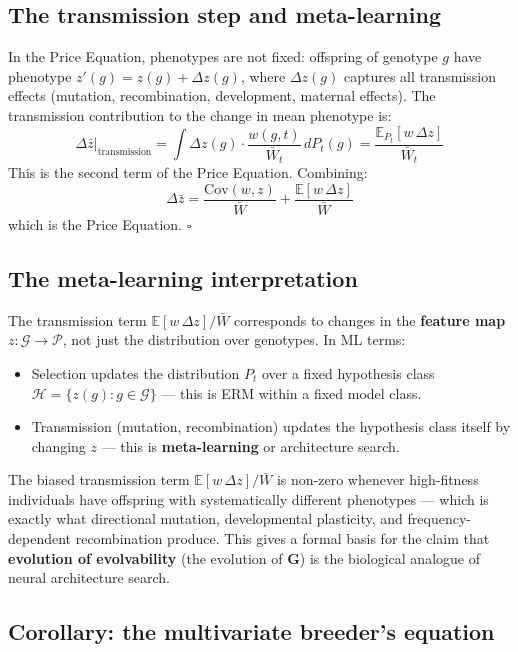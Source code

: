 \documentclass[12pt]{article}
\theoremstyle{remark}
\begin{document}
\subsection{The transmission step and meta-learning}

In the Price Equation, phenotypes are not fixed: offspring of genotype $g$ have phenotype $z'(g) = z(g) + \Delta z(g)$, where $\Delta z(g)$ captures all transmission effects (mutation, recombination, development, maternal effects). The transmission contribution to the change in mean phenotype is:
\[
  \Delta\bar{z}\big|_{\text{transmission}}
  = \int \Delta z(g) \cdot \frac{w(g,t)}{\bar{W}_t}\,dP_t(g)
  = \frac{\mathbb{E}_{P_t}[w\,\Delta z]}{\bar{W}_t}
\]
This is the second term of the Price Equation. Combining:
\[
  \Delta\bar{z} = \frac{\mathrm{Cov}(w, z)}{\bar{W}} + \frac{\mathbb{E}[w\,\Delta z]}{\bar{W}}
\]
which is the Price Equation. $\square$

\subsection{The meta-learning interpretation}

The transmission term $\mathbb{E}[w\,\Delta z]/\bar{W}$ corresponds to changes in the \textbf{feature map} $z: \mathcal{G} \to \mathcal{P}$, not just the distribution over genotypes. In ML terms:
\begin{itemize}
  \item Selection updates the distribution $P_t$ over a fixed hypothesis class $\mathcal{H} = \{z(g): g \in \mathcal{G}\}$ --- this is ERM within a fixed model class.
  \item Transmission (mutation, recombination) updates the hypothesis class itself by changing $z$ --- this is \textbf{meta-learning} or architecture search.
\end{itemize}
The biased transmission term $\mathbb{E}[w\,\Delta z]/\bar{W}$ is non-zero whenever high-fitness individuals have offspring with systematically different phenotypes --- which is exactly what directional mutation, developmental plasticity, and frequency-dependent recombination produce. This gives a formal basis for the claim that \textbf{evolution of evolvability} (the evolution of $\mathbf{G}$) is the biological analogue of neural architecture search.

\subsection{Corollary: the multivariate breeder's equation}
\end{document}
